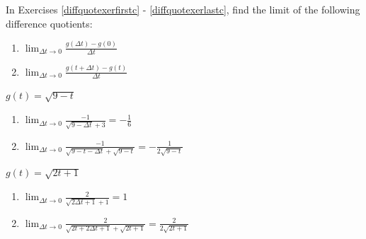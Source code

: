 \documentclass{ximera}
\begin{document}
\begin{question}
In Exercises \ref{diffquotexerfirstc} - \ref{diffquotexerlastc},  find the limit of the following difference quotients:



\begin{enumerate}

\item  $\lim_{\Delta t \rightarrow 0} \frac{g(\Delta t) - g(0)}{\Delta t}$

\item  $\lim_{\Delta t \rightarrow 0} \frac{g(t+\Delta t) - g(t)}{\Delta t}$

\end{enumerate}

\begin{problem} \label{diffquotexerfirstc}
$g(t) = \sqrt{9-t}$ 

\begin{solution}
\begin{enumerate}
\item $\lim_{\Delta t \rightarrow 0}\frac{-1}{\sqrt{9-\Delta t} +3}  = -\frac{1}{6}$

\item $\lim_{\Delta t \rightarrow 0} \frac{-1}{\sqrt{9-t-\Delta t} + \sqrt{9-t}}=   -\frac{1}{2 \sqrt{9-t}}$ 
\end{enumerate}
\end{solution}
\end{problem}

\begin{problem} \label{diffquotexerlastc}
 $g(t) = \sqrt{2t+1}$

 \begin{solution}
\begin{enumerate}
\item $\lim_{\Delta t \rightarrow 0}\frac{2}{\sqrt{2\Delta t+1} + 1}  =1$

\item $\lim_{\Delta t \rightarrow 0}\frac{2}{\sqrt{2t+2\Delta t+1} + \sqrt{2t+1}}=   \frac{2}{2 \sqrt{2t+1}}$  
\end{enumerate}
 \end{solution}
\end{problem}

\end{question}
\end{document}

